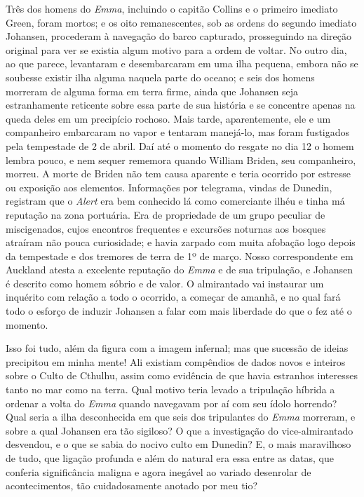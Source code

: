 Três dos homens do \emph{Emma}, incluindo o capitão Collins e o primeiro
imediato Green, foram mortos; e os oito remanescentes, sob as ordens do
segundo imediato Johansen, procederam à navegação do barco capturado,
prosseguindo na direção original para ver se existia algum motivo para a
ordem de voltar. No outro dia, ao que parece, levantaram e desembarcaram
em uma ilha pequena, embora não se soubesse existir ilha alguma naquela
parte do oceano; e seis dos homens morreram de alguma forma em terra
firme, ainda que Johansen seja estranhamente reticente sobre essa parte
de sua história e se concentre apenas na queda deles em um precipício
rochoso. Mais tarde, aparentemente, ele e um companheiro embarcaram no
vapor e tentaram manejá-lo, mas foram fustigados pela tempestade de 2 de
abril. Daí até o momento do resgate no dia 12 o homem lembra pouco, e
nem sequer rememora quando William Briden, seu companheiro, morreu. A morte
de Briden não tem causa aparente e teria ocorrido por estresse ou
exposição aos elementos. Informações por telegrama, vindas de Dunedin,
registram que o \emph{Alert} era bem conhecido lá como comerciante
ilhéu e tinha má reputação na zona portuária. Era de propriedade de um
grupo peculiar de miscigenados, cujos encontros frequentes e excursões
noturnas aos bosques atraíram não pouca curiosidade; e havia zarpado com
muita afobação logo depois da tempestade e dos tremores de terra de
1º de março. Nosso correspondente em Auckland
atesta a excelente reputação do \emph{Emma} e de sua tripulação, e
Johansen é descrito como homem sóbrio e de valor. O almirantado vai
instaurar um inquérito com relação a todo o ocorrido, a começar de
amanhã, e no qual fará todo o esforço de induzir Johansen a falar com
mais liberdade do que o fez até o momento.

Isso foi tudo, além da figura com a imagem infernal; mas que sucessão de
ideias precipitou em minha mente! Ali existiam compêndios de dados novos e inteiros sobre o Culto de Cthulhu, assim como evidência de que 
havia estranhos interesses tanto no mar como na terra. Qual motivo teria levado a tripulação híbrida a ordenar a volta do \emph{Emma} quando navegavam por aí com seu ídolo horrendo? Qual seria a ilha desconhecida em que seis
dos tripulantes do \emph{Emma} morreram, e sobre a qual Johansen era tão
sigiloso? O que a investigação do vice-almirantado desvendou, e o que se
sabia do nocivo culto em Dunedin? E, o mais maravilhoso de tudo, que
ligação profunda e além do natural era essa entre as datas, que conferia
significância maligna e agora inegável ao variado desenrolar de
acontecimentos, tão cuidadosamente anotado por meu tio?

